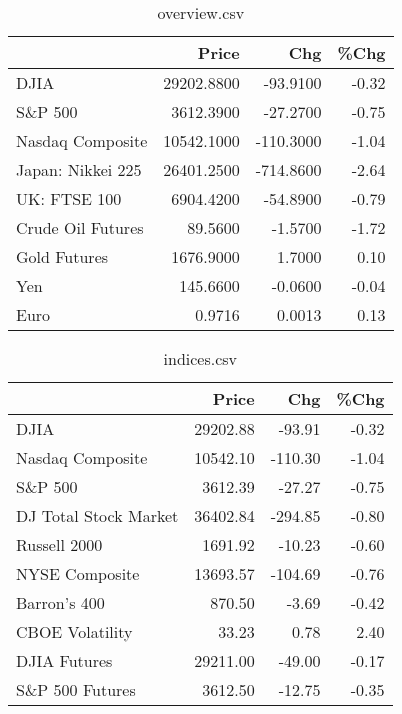 \documentclass{article}%
\begin{document}
\begin{table}[htbp]%
\caption{overview.csv}%
\centering%
\begin{adjustbox}{width=1\textwidth}%
\begin{tabular}{lrrr}
\toprule
                  &      Price &       Chg &  \%Chg \\
\midrule
             DJIA & 29202.8800 &  -93.9100 & -0.32 \\
          S\&P 500 &  3612.3900 &  -27.2700 & -0.75 \\
 Nasdaq Composite & 10542.1000 & -110.3000 & -1.04 \\
Japan: Nikkei 225 & 26401.2500 & -714.8600 & -2.64 \\
     UK: FTSE 100 &  6904.4200 &  -54.8900 & -0.79 \\
Crude Oil Futures &    89.5600 &   -1.5700 & -1.72 \\
     Gold Futures &  1676.9000 &    1.7000 &  0.10 \\
              Yen &   145.6600 &   -0.0600 & -0.04 \\
             Euro &     0.9716 &    0.0013 &  0.13 \\
\bottomrule
\end{tabular}
%
\end{adjustbox}%
\end{table}

%


\begin{table}[htbp]%
\caption{indices.csv}%
\centering%
\begin{adjustbox}{width=1\textwidth}%
\begin{tabular}{lrrr}
\toprule
                      &    Price &     Chg &  \%Chg \\
\midrule
                 DJIA & 29202.88 &  -93.91 & -0.32 \\
     Nasdaq Composite & 10542.10 & -110.30 & -1.04 \\
              S\&P 500 &  3612.39 &  -27.27 & -0.75 \\
DJ Total Stock Market & 36402.84 & -294.85 & -0.80 \\
         Russell 2000 &  1691.92 &  -10.23 & -0.60 \\
       NYSE Composite & 13693.57 & -104.69 & -0.76 \\
         Barron's 400 &   870.50 &   -3.69 & -0.42 \\
      CBOE Volatility &    33.23 &    0.78 &  2.40 \\
         DJIA Futures & 29211.00 &  -49.00 & -0.17 \\
      S\&P 500 Futures &  3612.50 &  -12.75 & -0.35 \\
\bottomrule
\end{tabular}
%
\end{adjustbox}%
\end{table}
\end{document}
